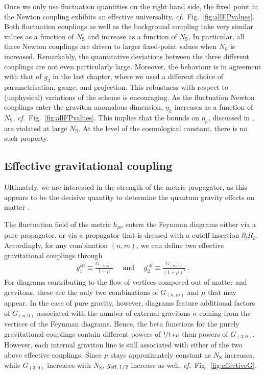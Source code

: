 \documentclass[11pt]{book}
\newcommand\NS{ N_{\scriptscriptstyle{\mathrm{S}}} }
\newcommand\cf{\textit{cf.}\ }
\numberwithin{equation}{chapter}
\begin{document}
Once we only use fluctuation quantities on the right hand side,
the fixed point in the Newton coupling exhibits an effective universality,
\cf Fig.~\ref{fig:allFPvalues}.
Both fluctuation couplings as well as the background coupling take very similar values as a
function of $\NS$ and increase as a function of $\NS$.
In particular, all three Newton couplings are driven to larger fixed-point values when $\NS$ is increased.
Remarkably, the quantitative deviations between the three different couplings are not even particularly large.
Moreover, the behaviour is in agreement with that of $g_3$ in the last chapter,
where we used a different choice of parametrisation, gauge, and projection.
This robustness with respect to (unphysical) variations of the scheme is encouraging.
As the fluctuation Newton couplings enter the graviton anomalous dimension,
$\eta_h$ increases as a function of $\NS$, \cf Fig.~\ref{fig:allFPvalues}.
This implies that the bounds on $\eta_h$, discussed in \cite{Meibohm:2015twa}, are violated at large $\NS$.
At the level of the cosmological constant, there is no such property.

\subsection{Effective gravitational coupling}

Ultimately, we are interested in the strength of the metric propagator,
as this appears to be the decisive quantity to determine the quantum gravity
effects on matter \cite{Eichhorn:2017eht,Eichhorn:2017ylw}.

The fluctuation field of the metric $h_{\mu\nu}$ enters the Feynman
diagrams either via a pure propagator, or via a propagator that
is dressed with a cutoff insertion $\partial_t R_k$.
Accordingly, for any combination $(n,m)$,
we can define two effective gravitational couplings through
\begin{align}
  g^{\mathrm{eff}}_1 \equiv \frac{G_{(n,m)}}{1+\mu}
  \quad \text{ and } \quad
  g^{\mathrm{eff}}_2 \equiv \frac{G_{(n,m)}}{\left(1+\mu\right)^2} \,.
\end{align}
For diagrams contributing to the flow of vertices composed out of
matter and gravitons, these are the only two combinations of $G_{(n,m)}$
and $\mu$ that may appear.
In the case of pure gravity, however,
diagrams feature additional factors of $G_{(n,0)}$
associated with the number of external gravitons $n$ coming from
the vertices of the Feynman diagrams.
Hence, the beta functions for the purely gravitational couplings
contain different powers of $\nicefrac{1}{1+\mu}$ than powers of $G_{(3,0)}$.
However, each internal graviton line is still associated with
either of the two above effective couplings.
Since $\mu$ stays approximately constant as $\NS$ increases,
while $G_{(3,0)}$ increases with $\NS$,
$g_{\rm eff,\,1/2}$ increase as well, \cf Fig.~\ref{fig:effectiveG}.
\end{document}
